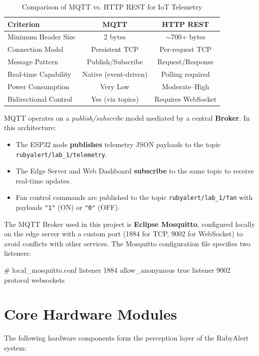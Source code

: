 \documentclass[12pt,a4paper]{report}
\begin{document}
\begin{table}[H]
    \centering
    \begin{tabular}{|l|c|c|}
        \hline
        \textbf{Criterion} & \textbf{MQTT} & \textbf{HTTP REST} \\ \hline
        Minimum Header Size & 2 bytes & $\sim$700+ bytes \\ \hline
        Connection Model & Persistent TCP & Per-request TCP \\ \hline
        Message Pattern & Publish/Subscribe & Request/Response \\ \hline
        Real-time Capability & Native (event-driven) & Polling required \\ \hline
        Power Consumption & Very Low & Moderate--High \\ \hline
        Bidirectional Control & Yes (via topics) & Requires WebSocket \\ \hline
    \end{tabular}
    \caption{Comparison of MQTT vs. HTTP REST for IoT Telemetry}
    \label{tab:mqtt_vs_http}
\end{table}

MQTT operates on a \emph{publish/subscribe} model mediated by a central \textbf{Broker}. In this architecture:
\begin{itemize}
    \item The ESP32 node \textbf{publishes} telemetry JSON payloads to the topic \texttt{rubyalert/lab\_1/telemetry}.
    \item The Edge Server and Web Dashboard \textbf{subscribe} to the same topic to receive real-time updates.
    \item Fan control commands are published to the topic \texttt{rubyalert/lab\_1/fan} with payloads \texttt{"1"} (ON) or \texttt{"0"} (OFF).
\end{itemize}

The MQTT Broker used in this project is \textbf{Eclipse Mosquitto}, configured locally on the edge server with a custom port (1884 for TCP, 9002 for WebSocket) to avoid conflicts with other services. The Mosquitto configuration file specifies two listeners:

\begin{codebox}[Python]
# local_mosquitto.conf
listener 1884
allow_anonymous true
listener 9002
protocol websockets
\end{codebox}

\section{Core Hardware Modules}
The following hardware components form the perception layer of the RubyAlert system:
\end{document}
